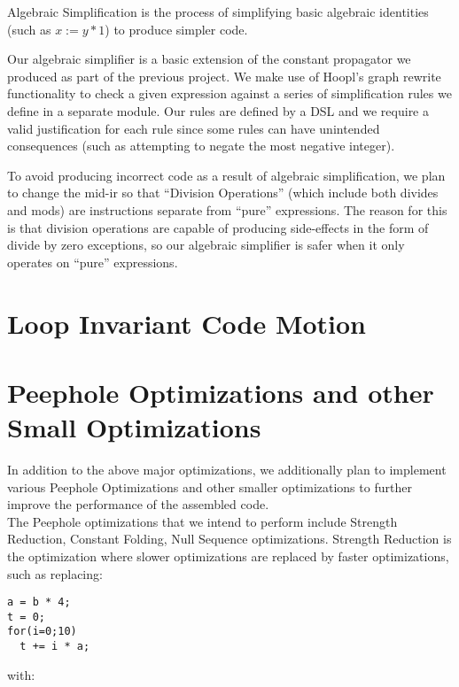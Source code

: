 \documentclass[11pt]{article}
\begin{document}
Algebraic Simplification is the process of simplifying basic algebraic
identities (such as $x := y * 1$) to
produce simpler code. 

Our algebraic simplifier is a basic extension of the constant
propagator we produced as part of the previous project. We make use of
Hoopl's graph rewrite functionality to check a given expression
against a series of simplification rules we define in a separate
module. Our rules are defined by a DSL and we require a valid
justification for each rule since some rules can have unintended
consequences (such as attempting to negate the most negative
integer). 

To avoid producing incorrect code as a result of algebraic
simplification, we plan to change the mid-ir so that ``Division
Operations'' (which include both divides and mods) are instructions
separate from ``pure'' expressions. The reason for this is that
division operations are capable of producing side-effects in the form
of divide by zero exceptions, so our algebraic simplifier is safer
when it only operates on ``pure'' expressions. 



\section {Loop Invariant Code Motion}
\label{sec:codehoist}

\section {Peephole Optimizations and other Small Optimizations}
\label{sec:peephole}
In addition to the above major optimizations, we additionally plan to
implement various Peephole Optimizations and other smaller
optimizations to further improve the performance of the assembled
code.\\

The Peephole optimizations that we intend to perform include Strength
Reduction, Constant Folding, Null Sequence optimizations. Strength
Reduction is the optimization where slower optimizations are replaced
by faster optimizations, such as replacing:\\

\begin{verbatim}
a = b * 4;
t = 0;
for(i=0;10)
  t += i * a;
\end{verbatim}

with:\\
\end{document}
